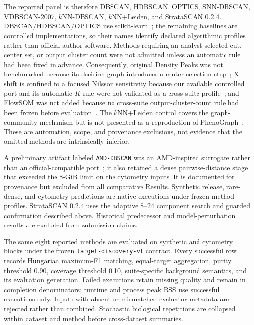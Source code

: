 \documentclass[conference]{IEEEtran}
\begin{document}
The reported panel is therefore DBSCAN, HDBSCAN, OPTICS, SNN-DBSCAN, VDBSCAN-2007, $k$NN-DBSCAN, $k$NN+Leiden, and StrataSCAN 0.2.4. DBSCAN/HDBSCAN/OPTICS use scikit-learn~\cite{pedregosa2011sklearn}; the remaining baselines are controlled implementations, so their names identify declared algorithmic profiles rather than official author software. Methods requiring an analyst-selected cut, center set, or output cluster count were not admitted unless an automatic rule had been fixed in advance. Consequently, original Density Peaks was not benchmarked because its decision graph introduces a center-selection step~\cite{rodriguez2014dpc}; X-shift is confined to a focused Nilsson sensitivity because our available controlled port and its automatic $K$ rule were not validated as a cross-suite profile~\cite{samusik2016phenotype}; and FlowSOM was not added because no cross-suite output-cluster-count rule had been frozen before evaluation~\cite{vangassen2015flowsom}. The $k$NN+Leiden control covers the graph-community mechanism but is not presented as a reproduction of PhenoGraph~\cite{levine2015aml}. These are automation, scope, and provenance exclusions, not evidence that the omitted methods are intrinsically inferior.

A preliminary artifact labeled \texttt{AMD-DBSCAN} was an AMD-inspired surrogate rather than an official-compatible port~\cite{wang2022amd}; it also retained a dense pairwise-distance stage that exceeded the 8-GiB limit on the cytometry inputs. It is documented for provenance but excluded from all comparative Results. Synthetic release, rare-dense, and cytometry predictions are native executions under frozen method profiles. StrataSCAN 0.2.4 uses the adaptive 8--24 component search and guarded confirmation described above. Historical predecessor and model-perturbation results are excluded from submission claims.

The same eight reported methods are evaluated on synthetic and cytometry blocks under the frozen \texttt{target-discovery-v1} contract. Every successful row records Hungarian maximum-F1 matching, equal-target aggregation, purity threshold 0.90, coverage threshold 0.10, suite-specific background semantics, and its evaluation generation. Failed executions retain missing quality and remain in completion denominators; runtime and process peak RSS use successful executions only. Inputs with absent or mismatched evaluator metadata are rejected rather than combined. Stochastic biological repetitions are collapsed within dataset and method before cross-dataset summaries.
\end{document}
